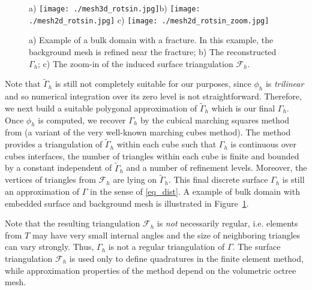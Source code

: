 \documentclass{article}
\newcommand{\F}{\mathcal F}
\begin{document}
\begin{figure}
  \begin{center}a)
    \texttt{[image: ./mesh3d\_rotsin.jpg]}b)
    \texttt{[image: ./mesh2d\_rotsin.jpg]} c)
    \texttt{[image: ./mesh2d\_rotsin\_zoom.jpg]}
    \caption{a) Example of a  bulk domain with a fracture. In this example, the background mesh is refined near the fracture; b) The reconstructed $\Gamma_h$; c) The zoom-in of the induced surface triangulation $\F_h$.}
    \label{fig1}
  \end{center}
\end{figure}
{Note that $\widetilde{\Gamma}_h$ is still not completely suitable for our purposes, since $\phi_h$ is \emph{trilinear}
and so numerical integration over its zero level is not straightforward. Therefore, we next build a suitable polygonal approximation of $\widetilde{\Gamma}_h$ which is our final $\Gamma_h$.}
Once $\phi_h$ is computed, we recover $\Gamma_h$ by the cubical marching squares method from \cite{MCM2} (a variant of the very well-known marching cubes method). The method provides a triangulation of $\widetilde{\Gamma}_h$ within each
cube such that {$\Gamma_h$ is  continuous over cubes interfaces}, the number of triangles within each cube is finite and bounded
by a constant independent of $\widetilde{\Gamma}_h$ and a number of refinement levels. Moreover, the vertices of triangles from $\mathcal{F}_h$ are lying on $\widetilde{\Gamma}_h$. This final discrete surface $\Gamma_h$ is still an approximation of $\Gamma$ in the sense of \eqref{eq_dist}. A example of bulk domain with embedded surface and background mesh is illustrated in Figure~\ref{fig1}.

Note that the resulting triangulation $\mathcal{F}_h$  is \emph{not} necessarily  regular, i.e. elements from $T$ may have very small internal angles and the size of neighboring triangles can vary strongly. Thus, $\Gamma_h$ is not { a regular triangulation of $\Gamma$.} The surface triangulation $\mathcal{F}_h$ is used only to define quadratures in the finite element method, while approximation properties of the method depend on the volumetric octree mesh.
\end{document}
